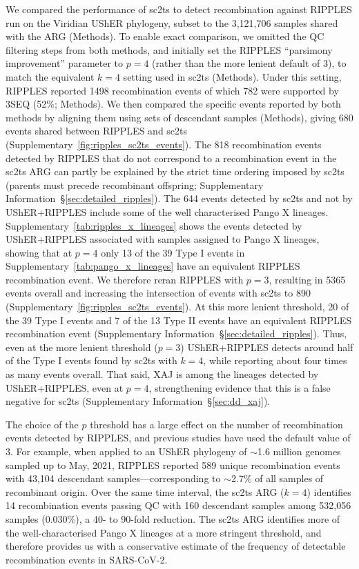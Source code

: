 \documentclass[12pt]{article}
\newcommand{\supref}[1]{Supplementary Information~\S\ref{#1}}
\newcommand{\siref}[1]{Supplementary~\ref{#1}}
\begin{document}
We compared the performance of sc2ts to detect recombination
against RIPPLES run on the Viridian UShER phylogeny,
subset to the 3,121,706 samples shared with the ARG (Methods).
To enable exact comparison, we omitted the QC filtering steps from both
methods, and initially set the RIPPLES ``parsimony improvement''
parameter to $p=4$ (rather than the more lenient default of 3),
to match the equivalent $k=4$ setting used in sc2ts (Methods).
Under this setting,
RIPPLES reported 1498 recombination events of which
782 were supported by 3SEQ (52\%; Methods).
We then compared
the specific events reported by both methods by aligning them
using sets of descendant samples (Methods),
giving 680 events shared between RIPPLES and sc2ts (\siref{fig:ripples_sc2ts_events}).
The 818 recombination events detected by RIPPLES that do not
correspond to a recombination event in the sc2ts ARG can partly
be explained by the strict time ordering imposed by sc2ts
(parents must precede recombinant offspring;
\supref{sec:detailed_ripples}).
The 644 events detected by sc2ts and not by UShER+RIPPLES
 include some of the well characterised Pango X lineages.
\siref{tab:ripples_x_lineages} shows the events detected
by UShER+RIPPLES associated with samples assigned to Pango X
lineages, showing that at $p=4$
only 13 of the 39 Type I events in \siref{tab:pango_x_lineages}
have an equivalent RIPPLES recombination event.
We therefore reran RIPPLES with $p=3$, resulting in 5365 events overall
and increasing the intersection of events with sc2ts to 890
(\siref{fig:ripples_sc2ts_events}).
At this more lenient threshold, 20 of the 39 Type I events
and 7 of the 13 Type II events
have an equivalent RIPPLES recombination event
(\supref{sec:detailed_ripples}).
Thus, even at the more lenient threshold ($p=3$) UShER+RIPPLES detects
around half of the Type I events found by sc2ts with $k=4$, while
reporting about four times as many events overall. That said, XAJ is among the
lineages detected by
UShER+RIPPLES, even at $p=4$, strengthening evidence that this is a false
negative for sc2ts (\supref{sec:dd_xaj}).

The choice of the $p$ threshold has a large effect
on the number of recombination events detected by RIPPLES, and
previous studies have used the default value of
$3$\cite{Turakhia2022,Smith2023tracking}.
For example, when applied to an UShER phylogeny of
$\sim$1.6 million genomes sampled up to May, 2021,
RIPPLES reported 589 unique recombination events with 43,104 descendant
samples---corresponding to $\sim$2.7\% of all samples of recombinant origin.
Over the same time interval, the sc2ts ARG ($k=4$) identifies
14 recombination events passing QC with
160 descendant samples among 532,056 samples (0.030\%),
a 40- to 90-fold reduction.
The sc2ts ARG identifies more of the well-characterised Pango X lineages
at a more stringent threshold, and therefore provides us with a
conservative estimate
of the frequency of detectable recombination events in SARS-CoV-2.
\end{document}
